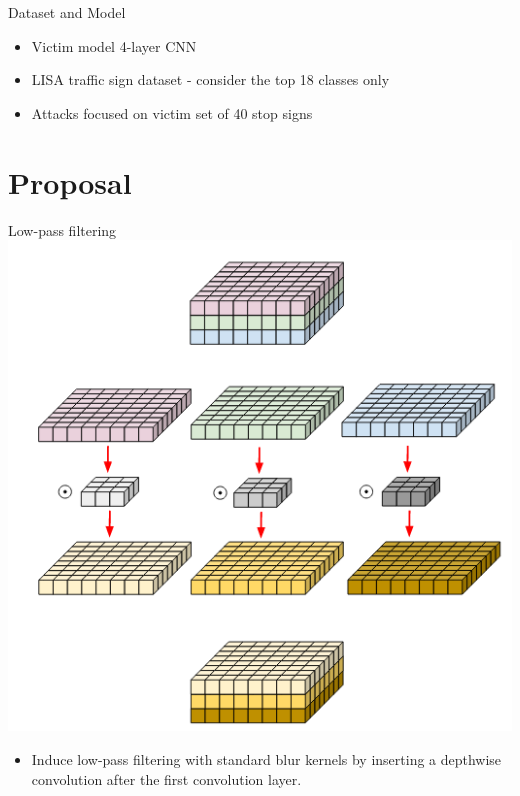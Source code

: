 \documentclass{beamer}
\begin{document}
\begin{frame}{Dataset and Model}
\begin{itemize}
	\item Victim model 4-layer CNN
	\item LISA traffic sign dataset - consider the top 18 classes only
	\item Attacks focused on victim set of 40 stop signs
\end{itemize}
\end{frame}

\section{Proposal}
\begin{frame}{Low-pass filtering}
	\centering
	\includegraphics[scale=0.3]{depthwise_conv.png}
	\begin{itemize}
		\item Induce low-pass filtering with standard blur kernels by inserting a depthwise convolution after the first convolution layer.
	\end{itemize}
\end{frame}
\end{document}
